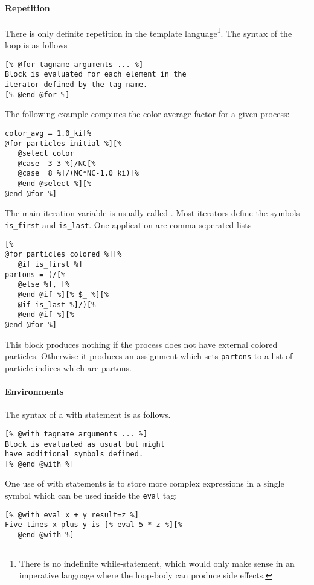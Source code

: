 \documentclass[11pt,a4paper]{refrep}
\begin{document}
\paragraph{Repetition}
There is only definite repetition in the template language\footnote{
There is no indefinite while-statement, which would only make sense
in an imperative language where the loop-body can produce side effects.}.
The syntax of the loop is as follows
\begin{lstlisting}[language=gosamt]
[% @for tagname arguments ... %]
Block is evaluated for each element in the
iterator defined by the tag name.
[% @end @for %]
\end{lstlisting}

The following example computes the color average factor for a given
process:
\begin{lstlisting}
color_avg = 1.0_ki[%
@for particles initial %][%
   @select color
   @case -3 3 %]/NC[%
   @case  8 %]/(NC*NC-1.0_ki)[%
   @end @select %][%
@end @for %]
\end{lstlisting}
\attention{}The main iteration variable is usually called \lit{\$\_}.
Most iterators define the symbols \texttt{is\_first}
and \texttt{is\_last}. One application are comma seperated lists
\begin{lstlisting}
[%
@for particles colored %][%
   @if is_first %]
partons = (/[%
   @else %], [%
   @end @if %][% $_ %][%
   @if is_last %]/)[%
   @end @if %][%
@end @for %]
\end{lstlisting}
This block produces nothing if the process does not have external
colored particles. Otherwise it produces an assignment which
sets \texttt{partons} to a list of particle indices which are partons.

\paragraph{Environments}
The syntax of a with statement is as follows.
\begin{lstlisting}[language=gosamt]
[% @with tagname arguments ... %]
Block is evaluated as usual but might
have additional symbols defined.
[% @end @with %]
\end{lstlisting}

One use of with statements is to store more complex expressions
in a single symbol which can be used inside the \texttt{eval}
tag:
\begin{lstlisting}
[% @with eval x + y result=z %]
Five times x plus y is [% eval 5 * z %][%
   @end @with %]
\end{lstlisting}
\end{document}
